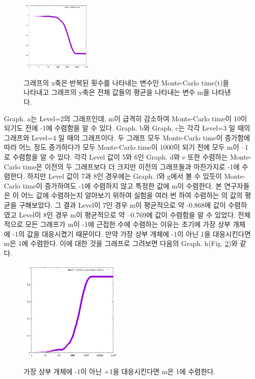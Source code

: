 \documentclass{gshs-report-v1.2}
\begin{document}
\begin{figure}[t]
\begin{center}
 		\includegraphics[width=3.5cm]{(g).png}\\
 		\caption{그래프의 x축은 반복된 횟수를 나타내는 변수인 Monte-Carlo time(t)을 나타내고 그래프의 y축은 전체 값들의 평균을 나타내는 변수 m을 나타낸다.} 
 		\label{Fig04}
 	\end{center}
\end{figure}

Graph. a는 Level=2의 그래프인데, m이 급격히 감소하여 Monte-Carlo time이 10이 되기도 전에 -1에 수렴함을 알 수 있다. Graph. b와 Graph. c는 각각 Level=3 일 때의 그래프와 Level=4 일 때의 그래프이다. 두 그래프 모두 Monte-Carlo time이 증가함에 따라 어느 정도 증가하다가 모두 Monte-Carlo time이 1000이 되기 전에 모두 m이 –1로 수렴함을 알 수 있다. 각각 Level 값이 5와 6인 Graph. d와 e 또한 수렴하는 Monte-Carlo time은 이전의 두 그래프보다 더 크지만 이전의 그래프들과 마찬가지로 -1에 수렴한다.  
하지만 Level 값이 7과 8인 경우에는 Graph. f와 g에서 볼 수 있듯이 Monte-Carlo time이 증가하여도 -1에 수렴하지 않고 특정한 값에 m이 수렴한다. 본 연구자들은 이 어느 값에 수렴하는지 알아보기 위하여 실험을 여러 번 하여 수렴하는 의 값의 평균을 구해보았다. 그 결과 Level이 7인 경우 m이 평균적으로 약 -0.868에 값이 수렴하였고 Level이 8인 경우 m이 평균적으로 약 –0.769에 값이 수렴함을 알 수 있었다.
전체적으로 모든 그래프가 m이 -1에 근접한 수에 수렴하는 이유는 초기에 가장 상부 개체에 -1의 값을 대응시켰기 때문이다. 만약 가장 상부 개체에 -1이 아닌 1을 대응시킨다면 m은 1에 수렴한다. 이에 대한 것을 그래프로 그려보면 다음의 Graph. h(Fig. \ref{Fig05})와 같다.\\

\begin{figure}[h]
	\begin{center}
		\includegraphics[width=5cm]{(h).png}\\
		\caption{가장 상부 개체에 -1이 아닌 +1을 대응시킨다면 m은 1에 수렴한다.} 
		\label{Fig05}
	\end{center}
\end{figure}
\end{document}
